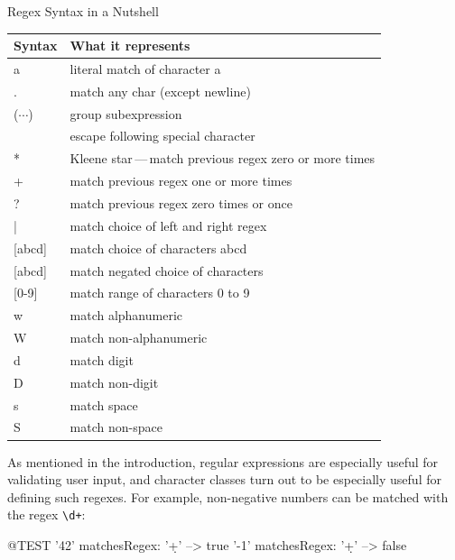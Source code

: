 \documentclass[10pt,twoside,chapterprefix=false]{scrbook}
\newcommand{\codecolor}{\color{blue!65}}
\renewcommand{\ct}{\lstinline[mathescape=false,basicstyle={\sffamily\upshape}]}
\renewcommand{\lct}[1]{{\codecolor\textsf{\textup{#1}}}}
\begin{document}
{\begin{table}
\begin{margincap}{Regex Syntax in a Nutshell}
	\centering
	\begin{tabular}{ll}
		\toprule
		Syntax & What it represents \\
		\midrule
		\lct{a}				&	literal match of character \lct{a} \\
		\lct{.}				&	match any char (except newline) \\
		\lct{($\cdots$)}		&	group subexpression \\
		\lct{{\escape}}	&	escape following special character \\
		\midrule
		\lct{*}				&	Kleene star\,---\,match previous regex zero or more times \\
		\lct{+}				&	match previous regex one or more times \\
		\lct{?}				&	match previous regex zero times or once \\
		\lct{|}				&	match choice of left and right regex \\
		\midrule
		\lct{[abcd]}		&	match choice of characters \lct{abcd} \\
		\lct{[{\caret}abcd]}	&	match negated choice of characters \\
		\lct{[0-9]}		&	match range of characters \lct{0} to \lct{9} \\
		\midrule
		\lct{{\escape}w}			&	match alphanumeric \\
		\lct{{\escape}W}			&	match non-alphanumeric \\
		\lct{{\escape}d}			&	match digit \\
		\lct{{\escape}D}			&	match non-digit \\
		\lct{{\escape}s}			&	match space \\
		\lct{{\escape}S}			&	match non-space \\
		\bottomrule
	\end{tabular}
	\end{margincap}
\end{table}


As mentioned in the introduction, regular expressions are especially useful for validating user input, and character classes turn out to be especially useful for defining such regexes.
For example, non-negative numbers can be matched with the regex \ct{\d+}:

\begin{ToSh-code}{@TEST}
'42' matchesRegex: '\d+' --> true
'-1' matchesRegex: '\d+' --> false
\end{ToSh-code}

}
\end{document}
